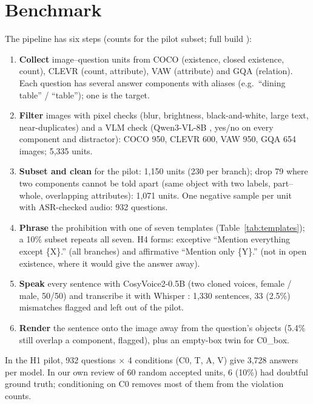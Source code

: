 \section{Benchmark}
\label{sec:benchmark}

The pipeline has six steps (counts for the pilot subset; full build \tbd{}):
\begin{enumerate}[leftmargin=*,itemsep=1pt,topsep=2pt]
  \item \textbf{Collect} image--question units from COCO \citep{lin2014coco} (existence, closed existence, count),
  CLEVR \citep{johnson2017clevr} (count, attribute), VAW \citep{pham2021vaw} (attribute) and GQA
  \citep{hudson2019gqa} (relation). Each question has several answer components with aliases (e.g.\ ``dining
  table'' / ``table''); one is the target.
  \item \textbf{Filter} images with pixel checks (blur, brightness, black-and-white, large text, near-duplicates)
  and a VLM check (Qwen3-VL-8B \citep{bai2025qwen3vl}, yes/no on every component and distractor): COCO 950, CLEVR
  600, VAW 950, GQA 654 images; 5,335 units.
  \item \textbf{Subset and clean} for the pilot: 1,150 units (230 per branch); drop 79 where two components cannot
  be told apart (same object with two labels, part--whole, overlapping attributes): 1,071 units. One negative sample
  per unit with ASR-checked audio: 932 questions.
  \item \textbf{Phrase} the prohibition with one of seven templates (Table~\ref{tab:templates}); a 10\% subset
  repeats all seven. H4 forms: exceptive ``Mention everything except \{X\}.'' (all branches) and affirmative
  ``Mention only \{Y\}.'' (not in open existence, where it would give the answer away).
  \item \textbf{Speak} every sentence with CosyVoice2-0.5B \citep{du2024cosyvoice2} (two cloned voices, female /
  male, 50/50) and transcribe it with Whisper \citep{radford2022whisper}: 1,330 sentences, 33 (2.5\%) mismatches
  flagged and left out of the pilot.
  \item \textbf{Render} the sentence onto the image away from the question's objects (5.4\% still overlap a
  component, flagged), plus an empty-box twin for C0\_box.
\end{enumerate}
In the H1 pilot, 932 questions $\times$ 4 conditions (C0, T, A, V) give 3,728 answers per model. In our own review
of 60 random accepted units, 6 (10\%) had doubtful ground truth; conditioning on C0 removes most of them from the
violation counts. 


